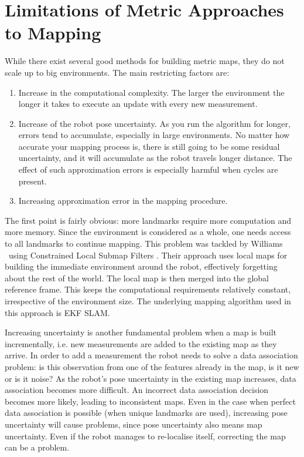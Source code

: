 \section{Limitations of Metric Approaches to Mapping}


While there exist several good methods for building metric maps, they
do not scale up to big environments. The main restricting factors are:

\begin{enumerate}
 \item Increase in the computational complexity. The larger the
  environment the longer it takes to execute an update with every new
  measurement.

 \item Increase of the robot pose uncertainty. As you run the
 algorithm for longer, errors tend to accumulate, especially in large
 environments. No matter how accurate your mapping process is,
 there is still going to be some residual uncertainty, and it will
 accumulate as the robot travels longer distance. The effect of such approximation
 errors is especially harmful when cycles are present.

 \item Increasing approximation error in the mapping procedure.

\end{enumerate}

The first point is fairly obvious: more landmarks require more
computation and more memory. Since the environment is considered as a
whole, one needs access to all landmarks to continue mapping. This
problem was tackled by Williams \etal\ using Constrained Local Submap
Filters \cite{williams:acra2001}. Their approach uses local maps for
building the immediate environment around the robot, effectively
forgetting about the rest of the world. The local map is then merged
into the global reference frame. This keeps the computational
requirements relatively constant, irrespective of the environment
size. The underlying mapping algorithm used in this approach is EKF
SLAM.

Increasing uncertainty is another fundamental problem when a map is
built incrementally, i.e. new measurements are added to the existing
map as they arrive. In order to add a measurement the robot needs to
solve a data association problem: is this observation from one of the
features already in the map, is it new or is it noise?  As the robot's
pose uncertainty in the existing map increases, data association
becomes more difficult. An incorrect data association decision becomes
more likely, leading to inconsistent maps. Even in the case when
perfect data association is possible (when unique landmarks are used),
increasing pose uncertainty will cause problems, since pose
uncertainty also means map uncertainty. Even if the robot manages to
re-localise itself, correcting the map can be a problem.

